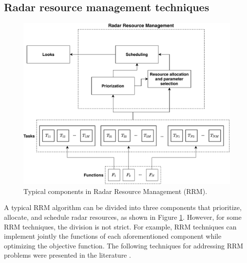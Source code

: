 \documentclass[english, 12pt, a4paper, elec, utf8, a-1b, online]{aaltothesis}
\numberwithin{equation}{section}
\begin{document}
\subsection{Radar resource management techniques} \label{sec:RRM_tech}

\begin{figure}[tb]
    \centering
    \includegraphics[width=.9\linewidth]{figures/RRM_diagram.pdf}
    \caption{Typical components in Radar Resource Management (RRM).}
    \label{fig:RRM_diagram}
\end{figure}

A typical RRM algorithm can be divided into three components that prioritize, allocate, and schedule radar resources, as shown in Figure \ref{fig:RRM_diagram}.
However, for some RRM techniques, the division is not strict.
For example, RRM techniques can implement jointly the functions of each aforementioned component while optimizing the objective function.
The following techniques for addressing RRM problems were presented in the literature \cite{Moo2016, Koch1999, Krishnamurthy2001, Wintenby2006, LaScala2006, Rajkumar1997, Rajkumar1998, Kastella1997, Kreucher2004, Kreucher2005, Xu2010}.
\end{document}
